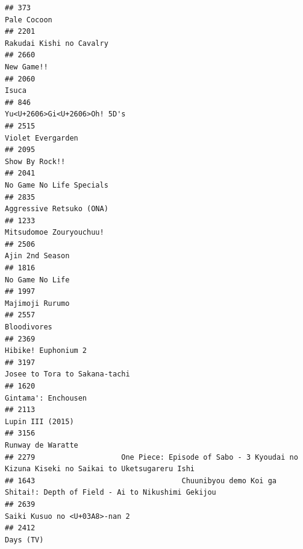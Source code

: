 \documentclass[
]{article}
\begin{document}
\begin{verbatim}
## 373                                                                                                Pale Cocoon
## 2201                                                                                  Rakudai Kishi no Cavalry
## 2660                                                                                                New Game!!
## 2060                                                                                                     Isuca
## 846                                                                               Yu<U+2606>Gi<U+2606>Oh! 5D's
## 2515                                                                                         Violet Evergarden
## 2095                                                                                            Show By Rock!!
## 2041                                                                                  No Game No Life Specials
## 2835                                                                                  Aggressive Retsuko (ONA)
## 1233                                                                                   Mitsudomoe Zouryouchuu!
## 2506                                                                                           Ajin 2nd Season
## 1816                                                                                           No Game No Life
## 1997                                                                                           Majimoji Rurumo
## 2557                                                                                               Bloodivores
## 2369                                                                                       Hibike! Euphonium 2
## 3197                                                                             Josee to Tora to Sakana-tachi
## 1620                                                                                       Gintama': Enchousen
## 2113                                                                                          Lupin III (2015)
## 3156                                                                                         Runway de Waratte
## 2279                    One Piece: Episode of Sabo - 3 Kyoudai no Kizuna Kiseki no Saikai to Uketsugareru Ishi
## 1643                                  Chuunibyou demo Koi ga Shitai!: Depth of Field - Ai to Nikushimi Gekijou
## 2639                                                                             Saiki Kusuo no <U+03A8>-nan 2
## 2412                                                                                                 Days (TV)

\end{verbatim}
\end{document}
